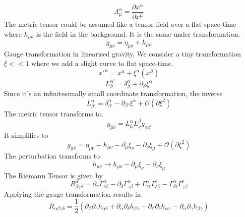 \documentclass[12pt, a4paper]{article}
\theoremstyle{plain}
\theoremstyle{definition}
\theoremstyle{remark}
\begin{document}
\begin{equation}
    \Lambda^{\alpha}_{\bar\mu} =\frac{\partial x^{\alpha}}{\partial x^{\bar\mu}}
\end{equation}
The metric tensor could be assumed like a tensor field over a flat space-time where $h_{\mu \nu}$ is the field in the background. It is the same under transformation.
\begin{equation}
    g_{\bar\mu \bar\nu} =\eta_{\bar\mu \bar\nu}+ h_{\bar\mu \bar\nu}
\end{equation}
Gauge transformation in linearised gravity. We consider a tiny transformation $\xi<<1$ where we add a slight curve to flat space-time.
\begin{equation}
    {x'}^\alpha = x^\alpha+\xi^\alpha(x^\beta)
\end{equation}
\begin{equation}
    L^{\alpha'}_\beta = \delta^\alpha_\beta + {\partial_\beta\xi^\alpha}
\end{equation}
Since it's an infinitesimally small coordinate transformation, the inverse
\begin{equation}
    L^{\alpha}_{\beta'} =  \delta^\alpha_{\beta'} - {\partial_{\beta'}\xi^\alpha}+\mathcal{O}({\partial}\xi^2)
\end{equation}
The metric tensor transforms to.
\begin{equation}
    g_{\bar\mu \bar\nu}=L^\alpha_{\bar\mu}L^\beta_{\bar\nu}g_{\alpha \beta}
\end{equation}
It simplifies to 
\begin{equation}
    g_{\bar\mu \bar\nu}=\eta_{\mu \nu}+h_{\mu \nu}-{\partial_\mu \xi_\nu}-{\partial_\nu \xi_\mu}+\mathcal{O}({\partial \xi^2})
\end{equation}
The perturbation transforms to
\begin{equation}
    h_{\mu \nu}\xrightarrow{}h_{\mu \nu}-{\partial_\mu \xi_\nu}-{\partial_\nu \xi_\mu}
\end{equation}
The Riemann Tensor is given by
\begin{equation}
    R^\alpha_{\beta \gamma \delta}={\partial_\gamma \Gamma^{\alpha}_{\delta \beta}}-{\partial_\delta \Gamma^{\alpha}_{\gamma \beta}}+\Gamma^\alpha_{\gamma \epsilon}\Gamma^\epsilon_{\delta \beta}-\Gamma^\alpha_{\delta \epsilon}\Gamma^\epsilon_{\gamma \beta}
\end{equation}
Applying the gauge transformation results in
\begin{equation}
    R_{\alpha \beta \gamma \delta}=\frac{1}{2}({\partial_\beta}{\partial_\gamma}h_{\alpha \delta}+{\partial_\alpha}{\partial_\delta}h_{\beta \gamma}-{\partial_\beta}{\partial_\delta}h_{\alpha \gamma}-{\partial_\alpha}{\partial_\gamma}h_{\beta \gamma})
\end{equation}
\end{document}
